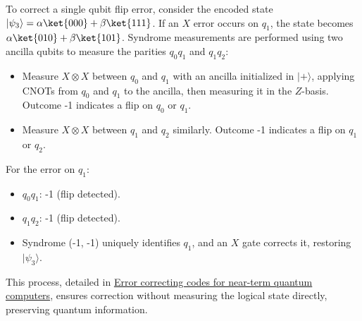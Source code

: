 \vspace{0.3cm}

To correct a single qubit flip error, consider the encoded state \(
|\psi_3\rangle = \alpha \ket{000} + \beta \ket{111} \). If an \( X \)
error occurs on \( q_1 \), the state becomes \( \alpha \ket{010} + \beta
\ket{101} \). Syndrome measurements are performed using two ancilla qubits
to measure the parities \( q_0 q_1 \) and \( q_1 q_2 \):

\begin{itemize}
  \item Measure \( X \otimes X \) between \( q_0 \) and \( q_1 \) with an
    ancilla initialized in \( |+\rangle \), applying CNOTs from \( q_0 \) and
    \( q_1 \) to the ancilla, then measuring it in the \( Z \)-basis. Outcome
    -1 indicates a flip on \( q_0 \) or \( q_1 \).
  \item Measure \( X \otimes X \) between \( q_1 \) and \( q_2 \) similarly.
    Outcome -1 indicates a flip on \( q_1 \) or \( q_2 \).
\end{itemize}

\vspace{0.3cm}

\noindent
For the error on \( q_1 \):
\begin{itemize}
  \item \( q_0 q_1 \): -1 (flip detected).
  \item \( q_1 q_2 \): -1 (flip detected).
  \item Syndrome (-1, -1) uniquely identifies \( q_1 \), and an \( X \) gate
    corrects it, restoring \( |\psi_3\rangle \).
\end{itemize}

This process, detailed in \href{https://www.ibm.com/quantum/blog/error-correction-codes}
{Error correcting codes for near-term quantum computers}, ensures correction
without measuring the logical state directly, preserving quantum information.



